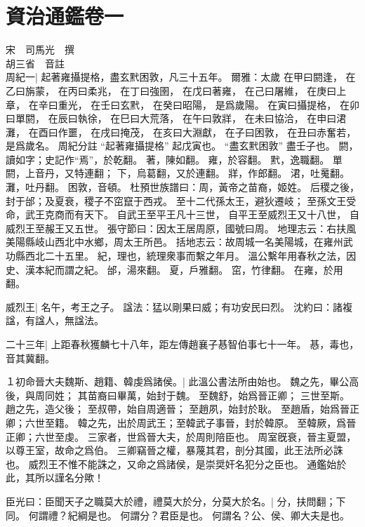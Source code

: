 \chapter{資治通鑑卷一}



宋　司馬光　撰\\胡三省　音註\\

周紀一|{
	起著雍攝提格，盡玄黓困敦，凡三十五年。
	爾雅：太歲
	在甲曰閼逢，
	在乙曰旃蒙，
	在丙曰柔兆，
	在丁曰強圉，
	在戊曰著雍，
	在己曰屠維，
	在庚曰上章，
	在辛曰重光，
	在壬曰玄黓，
	在癸曰昭陽，
	是爲歲陽。
	在寅曰攝提格，
	在卯曰單閼，
	在辰曰執徐，
	在巳曰大荒落，
	在午曰敦牂，
	在未曰協洽，
	在申曰涒灘，
	在酉曰作噩，
	在戌曰掩茂，
	在亥曰大淵獻，
	在子曰困敦，
	在丑曰赤奮若，
	是爲歲名。
	周紀分註 “起著雍攝提格” 起戊寅也。
	“盡玄黓困敦” 盡壬子也。
	閼，讀如字；史記作“焉”，於乾翻。
	著，陳如翻。
	雍，於容翻。
	黓，逸職翻。
	單閼，上音丹，又特連翻；
	下，烏葛翻，又於連翻。
	牂，作郎翻。
	涒，吐䰟翻。
	灘，吐丹翻。
	困敦，音頓。
	杜預世族譜曰：周，黃帝之苗裔，姬姓。
	后稷之後，封于邰；及夏衰，稷子不窋竄于西戎。
	至十二代孫太王，避狄遷岐；
	至孫文王受命，武王克商而有天下。
	自武王至平王凡十三世，
	自平王至威烈王又十八世，
	自威烈王至赧王又五世。
	張守節曰：因太王居周原，國號曰周。
	地理志云：右扶風美陽縣岐山西北中水鄉，周太王所邑。
	括地志云：故周城一名美陽城，在雍州武功縣西北二十五里。
	紀，理也，統理衆事而繫之年月。
	溫公繫年用春秋之法，因史、漢本紀而謂之紀。
	邰，湯來翻。
	夏，戶雅翻。
	窋，竹律翻。
	在雍，於用翻。
}
\par

威烈王|{
	名午，考王之子。
	諡法：猛以剛果曰威；有功安民曰烈。
	沈約曰：諸複諡，有諡人，無諡法。
	}

二十三年|{
	上距春秋獲麟七十八年，距左傳趙襄子惎智伯事七十一年。
	惎，毒也，音其冀翻。
}

１初命晉大夫魏斯、趙籍、韓虔爲諸侯。|{
	此溫公書法所由始也。
	魏之先，畢公高後，與周同姓；
	其苗裔曰畢萬，始封于魏。
	至魏舒，始爲晉正卿；
	三世至斯。
	趙之先，造父後；
	至叔帶，始自周適晉；
	至趙夙，始封於耿。
	至趙盾，始爲晉正卿；六世至籍。
	韓之先，出於周武王；至韓武子事晉，封於韓原。
	至韓厥，爲晉正卿；六世至虔。
	三家者，世爲晉大夫，於周則陪臣也。
	周室旣衰，晉主夏盟，以尊王室，故命之爲伯。
	三卿竊晉之權，暴蔑其君，剖分其國，此王法所必誅也。
	威烈王不惟不能誅之，又命之爲諸侯，是崇奨奸名犯分之臣也。
	通鑑始於此，其所以謹名分歟！
}


臣光曰：臣聞天子之職莫大於禮，禮莫大於分，分莫大於名。|{
	分，扶問翻；下同。
}
何謂禮？紀綱是也。
何謂分？君臣是也。
何謂名？公、侯、卿大夫是也。


